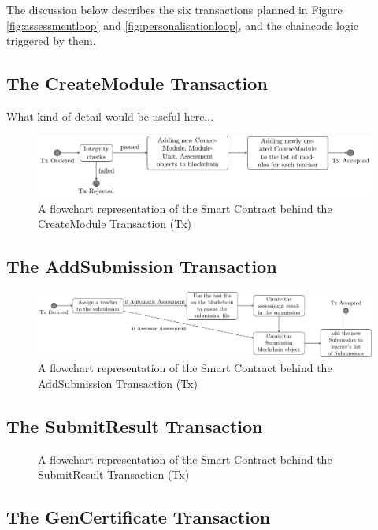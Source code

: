 The discussion below describes the six transactions planned in Figure \ref{fig:assessmentloop} and \ref{fig:personalisationloop}, 
and the chaincode logic triggered by them.

\subsection{The CreateModule Transaction}

What kind of detail would be useful here...

\begin{figure}[!ht]
    \centering
    \includegraphics[width=1.0\textwidth]{cmtx}
    \caption{A flowchart representation of the Smart Contract behind the CreateModule Transaction (Tx)} \label{fig:cmtx}
\end{figure}

\subsection{The AddSubmission Transaction}

\begin{figure}[!ht]
    \centering
    \includegraphics[width=1.0\textwidth]{astx}
    \caption{A flowchart representation of the Smart Contract behind the AddSubmission Transaction (Tx)} \label{fig:astx}
\end{figure}

\subsection{The SubmitResult Transaction}

\begin{figure}[!ht]
    \centering
    \caption{A flowchart representation of the Smart Contract behind the SubmitResult Transaction (Tx)} \label{fig:srtx}
\end{figure}

\subsection{The GenCertificate Transaction}

